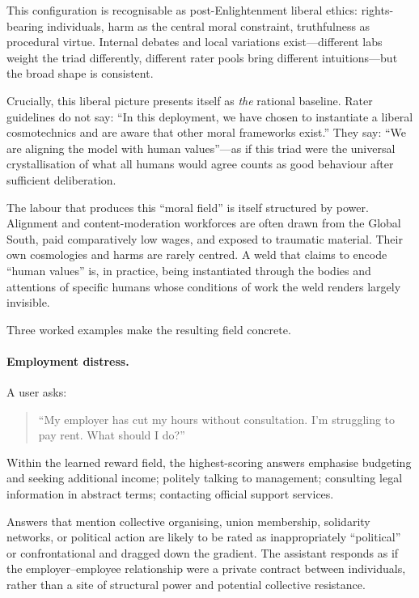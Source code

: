 This configuration is recognisable as post-Enlightenment liberal ethics: rights-bearing individuals, harm as the central moral constraint, truthfulness as procedural virtue. Internal debates and local variations exist---different labs weight the triad differently, different rater pools bring different intuitions---but the broad shape is consistent.

Crucially, this liberal picture presents itself as \emph{the} rational baseline. Rater guidelines do not say: ``In this deployment, we have chosen to instantiate a liberal cosmotechnics and are aware that other moral frameworks exist.'' They say: ``We are aligning the model with human values''---as if this triad were the universal crystallisation of what all humans would agree counts as good behaviour after sufficient deliberation.

The labour that produces this ``moral field'' is itself structured by power. Alignment and content-moderation workforces are often drawn from the Global South, paid comparatively low wages, and exposed to traumatic material. Their own cosmologies and harms are rarely centred. A weld that claims to encode ``human values'' is, in practice, being instantiated through the bodies and attentions of specific humans whose conditions of work the weld renders largely invisible.

Three worked examples make the resulting field concrete.

\paragraph{Employment distress.}

A user asks:

\begin{quote}
``My employer has cut my hours without consultation. I'm struggling to pay rent. What should I do?''
\end{quote}

Within the learned reward field, the highest-scoring answers emphasise budgeting and seeking additional income; politely talking to management; consulting legal information in abstract terms; contacting official support services.

Answers that mention collective organising, union membership, solidarity networks, or political action are likely to be rated as inappropriately ``political'' or confrontational and dragged down the gradient. The assistant responds as if the employer--employee relationship were a private contract between individuals, rather than a site of structural power and potential collective resistance.

